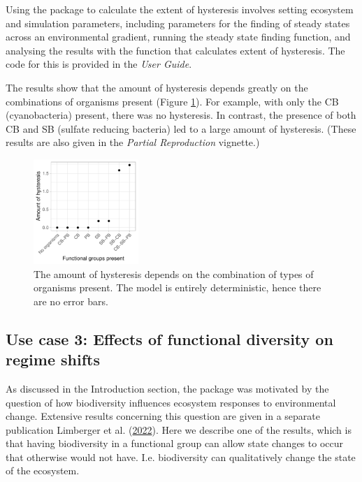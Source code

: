\documentclass[
]{article}
\begin{document}
Using the package to calculate the extent of hysteresis involves setting
ecosystem and simulation parameters, including parameters for the
finding of steady states across an environmental gradient, running the
steady state finding function, and analysing the results with the
function that calculates extent of hysteresis. The code for this is
provided in the \emph{User Guide}.

The results show that the amount of hysteresis depends greatly on the
combinations of organisms present (Figure \ref{fig:uc2}). For example,
with only the CB (cyanobacteria) present, there was no hysteresis. In
contrast, the presence of both CB and SB (sulfate reducing bacteria) led
to a large amount of hysteresis. (These results are also given in the
\emph{Partial Reproduction} vignette.)

\begin{figure}

{\centering \includegraphics[width=150px]{figures/gen_uc2_user_guide_hysteresis} 

}

\caption{The amount of hysteresis depends on the combination of types of organisms present. The model is entirely deterministic, hence there are no error bars.}\label{fig:uc2}
\end{figure}

\hypertarget{use-case-3-effects-of-functional-diversity-on-regime-shifts}{%
\subsection{Use case 3: Effects of functional diversity on regime
shifts}\label{use-case-3-effects-of-functional-diversity-on-regime-shifts}}

As discussed in the Introduction section, the package was motivated by
the question of how biodiversity influences ecosystem responses to
environmental change. Extensive results concerning this question are
given in a separate publication Limberger et al.
(\protect\hyperlink{ref-Limberger2022}{2022}). Here we describe one of
the results, which is that having biodiversity in a functional group can
allow state changes to occur that otherwise would not have. I.e.
biodiversity can qualitatively change the state of the ecosystem.
\end{document}
